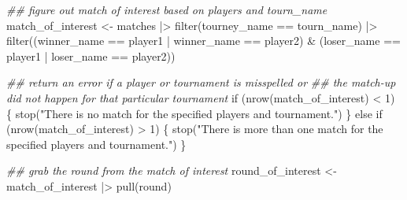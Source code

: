 \documentclass[
  letterpaper,
  DIV=11,
  numbers=noendperiod]{scrartcl}
\newenvironment{Shaded}{\begin{snugshade}}{\end{snugshade}}
\newcommand{\ControlFlowTok}[1]{\textcolor[rgb]{0.00,0.23,0.31}{#1}}
\newcommand{\DecValTok}[1]{\textcolor[rgb]{0.68,0.00,0.00}{#1}}
\newcommand{\DocumentationTok}[1]{\textcolor[rgb]{0.37,0.37,0.37}{\textit{#1}}}
\newcommand{\FunctionTok}[1]{\textcolor[rgb]{0.28,0.35,0.67}{#1}}
\newcommand{\NormalTok}[1]{\textcolor[rgb]{0.00,0.23,0.31}{#1}}
\newcommand{\OtherTok}[1]{\textcolor[rgb]{0.00,0.23,0.31}{#1}}
\newcommand{\SpecialCharTok}[1]{\textcolor[rgb]{0.37,0.37,0.37}{#1}}
\newcommand{\StringTok}[1]{\textcolor[rgb]{0.13,0.47,0.30}{#1}}
\begin{document}
\begin{Shaded}
\begin{Highlighting}[]
  \DocumentationTok{\#\# figure out match of interest based on players and tourn\_name}
\NormalTok{  match\_of\_interest }\OtherTok{\textless{}{-}}\NormalTok{ matches }\SpecialCharTok{|\textgreater{}} \FunctionTok{filter}\NormalTok{(tourney\_name }\SpecialCharTok{==}\NormalTok{ tourn\_name) }\SpecialCharTok{|\textgreater{}}
    \FunctionTok{filter}\NormalTok{((winner\_name }\SpecialCharTok{==}\NormalTok{ player1 }\SpecialCharTok{|}\NormalTok{ winner\_name }\SpecialCharTok{==}\NormalTok{ player2) }\SpecialCharTok{\&}
\NormalTok{             (loser\_name }\SpecialCharTok{==}\NormalTok{ player1 }\SpecialCharTok{|}\NormalTok{ loser\_name }\SpecialCharTok{==}\NormalTok{ player2))}
  
  \DocumentationTok{\#\# return an error if a player or tournament is misspelled or}
  \DocumentationTok{\#\# the match{-}up did not happen for that particular tournament}
  \ControlFlowTok{if}\NormalTok{ (}\FunctionTok{nrow}\NormalTok{(match\_of\_interest) }\SpecialCharTok{\textless{}} \DecValTok{1}\NormalTok{) \{}
    \FunctionTok{stop}\NormalTok{(}\StringTok{"There is no match for the specified players and tournament."}\NormalTok{)}
\NormalTok{  \} }\ControlFlowTok{else} \ControlFlowTok{if}\NormalTok{ (}\FunctionTok{nrow}\NormalTok{(match\_of\_interest) }\SpecialCharTok{\textgreater{}} \DecValTok{1}\NormalTok{) \{}
    \FunctionTok{stop}\NormalTok{(}\StringTok{"There is more than one match for the specified players and tournament."}\NormalTok{)}
\NormalTok{  \}}
  
  \DocumentationTok{\#\# grab the round from the match of interest}
\NormalTok{  round\_of\_interest }\OtherTok{\textless{}{-}}\NormalTok{ match\_of\_interest }\SpecialCharTok{|\textgreater{}} \FunctionTok{pull}\NormalTok{(round)}
  

\end{Highlighting}
\end{Shaded}
\end{document}
